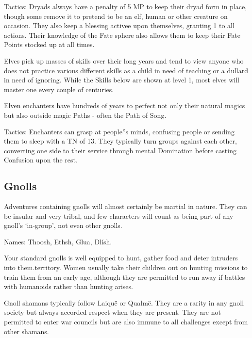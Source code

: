 Tactics: Dryads always have a penalty of 5 MP to keep their dryad form in place, though some remove it to pretend to be an elf, human or other creature on occasion.  They also keep a blessing activee upon themselves, granting 1 to all actions.  Their knowledge of the Fate sphere also allows them to keep their Fate Points stocked up at all times.

\label{elf}
\elf

Elves pick up masses of skills over their long years and tend to view anyone who does not practice various different skills as a child in need of teaching or a dullard in need of ignoring.  While the Skills below are shown at level 1, most elves will master one every couple of centuries.

\label{elven_enchanter}

\elvenenchanter

Elven enchanters have hundreds of years to perfect not only their natural magics but also outside magic Paths - often the Path of Song.

	Tactics: Enchanters can grasp at people''s minds, confusing people or sending them to sleep with a TN of 13.  They typically turn groups against each other, converting one side to their service through mental Domination before casting Confusion upon the rest.

\subsection{Gnolls}

Adventures containing gnolls will almost certainly be martial in nature.  They can be insular and very tribal, and few characters will count as being part of any gnoll's `in-group', not even other gnolls.

	Names: Thoosh, Ethsh, Glua, Dl\'{i}sh.

\label{gnoll_hunter}
\gnollhunter

Your standard gnolls is well equipped to hunt, gather food and deter intruders into them.territory.  Women usually take their children out on hunting missions to train them from an early age, although they are permitted to run away if battles with humanoids rather than hunting arises.

\label{gnoll_shaman}
\gnollshaman 

Gnoll shamans typically follow Laiqu\"{e} or Qualm\"{e}.  They are a rarity in any gnoll society but always accorded respect when they are present.  They are not permitted to enter war councils but are also immune to all challenges except from other shamans.

